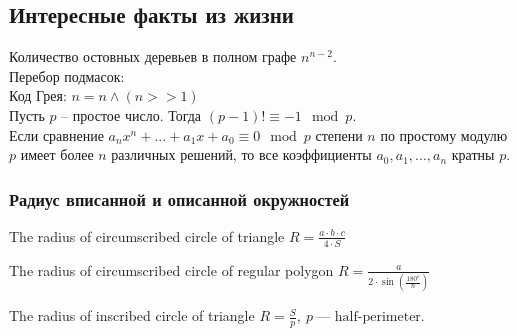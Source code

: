 \subsection{Интересные факты из жизни}
Количество остовных деревьев в полном графе $n^{n - 2}$. \\
Перебор подмасок:  \\
Код Грея: $n = n \land (n >> 1)$ \\



Пусть $p$ -- простое число. Тогда $(p - 1)! \equiv -1 \mod p$. \\
Если сравнение $a_nx^n+ ... + a_1x+a_0 \equiv 0 \mod p$ степени $n$ по простому модулю $p$ имеет более $n$ различных решений, то все коэффициенты $a_0, a_1, . . . , a_n$ кратны $p$. \\

\subsubsection{Радиус вписанной и описанной окружностей}

The radius of circumscribed circle of triangle
$R = \frac{a\cdot b \cdot c}{4\cdot S}$

The radius of circumscribed circle of regular polygon
$R = \frac{a}{2\cdot \sin (\frac{180^o}{n})}$

The radius of inscribed circle of triangle
$R = \frac{S}{p},\ p\ \text{--- half-perimeter.}$

